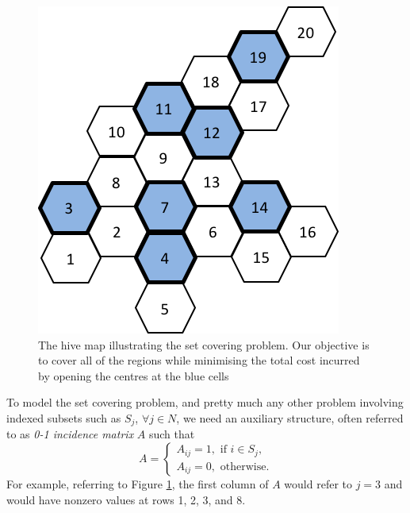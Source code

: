 \begin{figure}[h]
	\centering
	\includegraphics[scale=0.8]{part_1/chapter_8/figures/hive_setcover.png}
	\caption{The hive map illustrating the set covering problem. Our objective is to cover all of the regions while minimising the total cost incurred by opening the centres at the blue cells} \label{p1c8:fig:set_covering}
\end{figure}

To model the set covering problem, and pretty much any other problem involving indexed subsets such as $S_j$, $\forall j \in N$, we need an auxiliary structure, often referred to as \emph{0-1 incidence matrix} $A$ such that
%
\begin{equation*}
	A = \begin{cases}
		A_{ij} = 1, \text{ if } i \in S_j, \\
		A_{ij} = 0, \text{ otherwise.}
	\end{cases}
\end{equation*}
%
For example, referring to Figure \ref{p1c8:fig:set_covering}, the first column of $A$ would refer to $j = 3$ and would have nonzero values at rows 1, 2, 3, and 8.

